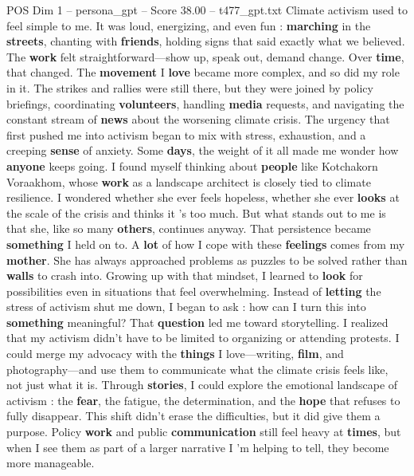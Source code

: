 \begin{textsample}{POS Dim 1 – persona\_gpt – Score 38.00 – t477\_gpt.txt}  \label{ex:f1_pos_030}
Climate activism used to feel simple to me.
It was loud, energizing, and even fun : \textbf{marching} in the \textbf{streets}, chanting with \textbf{friends}, holding signs that said exactly what we believed.
The \textbf{work} felt straightforward—show up, speak out, demand change.
Over \textbf{time}, that changed.
The \textbf{movement} I \textbf{love} became more complex, and so did my role in it.
The strikes and rallies were still there, but they were joined by policy briefings, coordinating \textbf{volunteers}, handling \textbf{media} requests, and navigating the constant stream of \textbf{news} about the worsening climate crisis.
The urgency that first pushed me into activism began to mix with stress, exhaustion, and a creeping \textbf{sense} of anxiety.
Some \textbf{days}, the weight of it all made me wonder how \textbf{anyone} keeps going.
I found myself thinking about \textbf{people} like Kotchakorn Voraakhom, whose \textbf{work} as a landscape architect is closely tied to climate resilience.
I wondered whether she ever feels hopeless, whether she ever \textbf{looks} at the scale of the crisis and thinks it ’s too much.
But what stands out to me is that she, like so many \textbf{others}, continues anyway.
That persistence became \textbf{something} I held on to.
A \textbf{lot} of how I cope with these \textbf{feelings} comes from my \textbf{mother}.
She has always approached problems as puzzles to be solved rather than \textbf{walls} to crash into.
Growing up with that mindset, I learned to \textbf{look} for possibilities even in situations that feel overwhelming.
Instead of \textbf{letting} the stress of activism shut me down, I began to ask : how can I turn this into \textbf{something} meaningful?
That \textbf{question} led me toward storytelling.
I realized that my activism didn't have to be limited to organizing or attending protests.
I could merge my advocacy with the \textbf{things} I love—writing, \textbf{film}, and photography—and use them to communicate what the climate crisis feels like, not just what it is.
Through \textbf{stories}, I could explore the emotional landscape of activism : the \textbf{fear}, the fatigue, the determination, and the \textbf{hope} that refuses to fully disappear.
This shift didn't erase the difficulties, but it did give them a purpose.
Policy \textbf{work} and public \textbf{communication} still feel heavy at \textbf{times}, but when I see them as part of a larger narrative I ’m helping to tell, they become more manageable.

\end{textsample}
